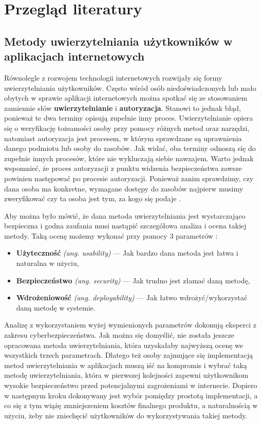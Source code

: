 \chapter{Przegląd literatury}
\section{Metody uwierzytelniania użytkowników w aplikacjach internetowych}
Równolegle z rozwojem technologii internetowych rozwijały się formy uwierzytelniania użytkowników. Często wśród osób niedoświadczonych lub mało obytych w sprawie aplikacji internetowych można spotkać się ze stosowaniem zamiennie słów \textbf{uwierzytelnianie} i \textbf{autoryzacja}. Stanowi to jednak błąd, ponieważ te dwa terminy opisują zupełnie inny proces. Uwierzytelnianie opiera się o weryfikację tożsamości osoby przy pomocy różnych metod oraz narzędzi, natomiast autoryzacja jest procesem, w którym sprawdzane są uprawnienia danego podmiotu lub osoby do zasobów. Jak widać, oba terminy odnoszą się do zupełnie innych procesów, które nie wykluczają siebie nawzajem. Warto jednak wspomnieć, że proces autoryzacji z punktu widzenia bezpieczeństwa zawsze powinien następować po procesie autoryzacji. Ponieważ zanim sprawdzimy, czy dana osoba ma konkretne, wymagane dostępy do zasobów najpierw musimy zweryfikować czy ta osoba jest tym, za kogo się podaje \cite{JK2020}.

Aby można było mówić, że dana metoda uwierzytelniania jest wystarczająco bezpieczna i godna zaufania musi nastąpić szczegółowa analiza i ocena takiej metody. Taką ocenę możemy wykonać przy pomocy 3 parametrów \cite{CyberArk}:
\begin{itemize}
  \item \textbf{Użyteczność} \emph{(ang. usability)} --- Jak bardzo dana metoda jest łatwa i naturalna w użyciu,
  \item \textbf{Bezpieczeństwo} \emph{(ang. security)} --- Jak trudno jest złamać daną metodę,
  \item \textbf{Wdrożeniowość} \emph{(ang. deployability)} --- Jak łatwo wdrożyć/wykorzystać daną metodę w systemie.  
\end{itemize}

Analizę z wykorzystaniem wyżej wymienionych parametrów dokonują eksperci z zakresu cyberbezpieczeństwa. Jak można się domyślić, nie została jeszcze opracowana metoda uwierzytelniania, która  uzyskałaby najwyższą ocenę we wszystkich trzech parametrach. Dlatego też osoby zajmujące się implementacją metod uwierzytelniania w aplikacjach muszą iść na kompromis i wybrać taką metodę uwierzytelniania, która w pierwszej kolejności zapewni użytkownikom wysokie bezpieczeństwo przed potencjalnymi zagrożeniami w internecie. Dopiero w następnym kroku dokonywany jest wybór pomiędzy prostotą implementacji, a co się z tym wiążę zmniejszeniem kosztów finalnego produktu, a naturalnością w użyciu, żeby nie zniechęcić użytkowników do wykorzystywania takiej metody.

